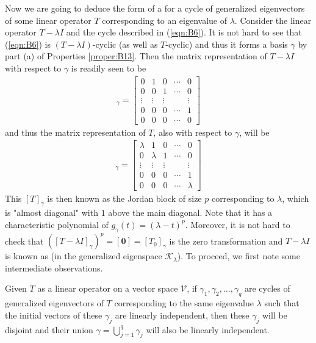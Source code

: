 Now we are going to deduce the form of a  for a cycle of generalized eigenvectors of some linear operator $T$ corresponding to an eigenvalue of $\lambda$. Consider the linear operator $T-\lambda I$ and the cycle described in (\ref{eqn:B6}). It is not hard to see that (\ref{eqn:B6}) is $(T-\lambda I)$-cyclic (as well as $T$-cyclic) and thus it forms a basis $\gamma$ by part (a) of Properties \ref{proper:B13}. Then the matrix representation of $T-\lambda I$ with respect to $\gamma$ is readily seen to be
\begin{align}
[T-\lambda I]_\gamma = 
\begin{bmatrix}
0 & 1 & 0 & \cdots & 0 \\
0 & 0 & 1 & \cdots & 0 \\
\vdots & \vdots & \vdots & & \vdots \\
0 & 0 & 0 & \cdots & 1 \\
0 & 0 & 0 & \cdots & 0
\end{bmatrix}
\end{align}
and thus the matrix representation of $T$, also with respect to $\gamma$, will be
\begin{align}
[T]_\gamma = 
\begin{bmatrix}
\lambda & 1 & 0 & \cdots & 0 \\
0 & \lambda  & 1 & \cdots & 0 \\
\vdots & \vdots & \vdots & & \vdots \\
0 & 0 & 0 & \cdots & 1 \\
0 & 0 & 0 & \cdots & \lambda 
\end{bmatrix} 
\label{eqn:B8}
\end{align}
This $[T]_\gamma$ is then known as the Jordan block of size $p$ corresponding to $\lambda$, which is "almost diagonal" with $1$ above the main diagonal. Note that it has a characteristic polynomial of $g_\gamma(t) = (\lambda-t)^p$. Moreover, it is not hard to check that $([T-\lambda I]_\gamma)^p = [\textbf{0}] = [T_0]_\gamma$ is the zero transformation and $T-\lambda I$ is known as  (in the generalized eigenspace $\mathcal{K}_\lambda$). To proceed, we first note some intermediate observations.
\begin{thm}
Given $T$ as a linear operator on a vector space $\mathcal{V}$, if $\gamma_1, \gamma_2, \ldots, \gamma_q$ are cycles of generalized eigenvectors of $T$ corresponding to the same eigenvalue $\lambda$ such that the initial vectors of these $\gamma_j$ are linearly independent, then these $\gamma_j$ will be disjoint and their union $\gamma = \bigcup_{j=1}^{q} \gamma_j$ will also be linearly independent.
\end{thm}
